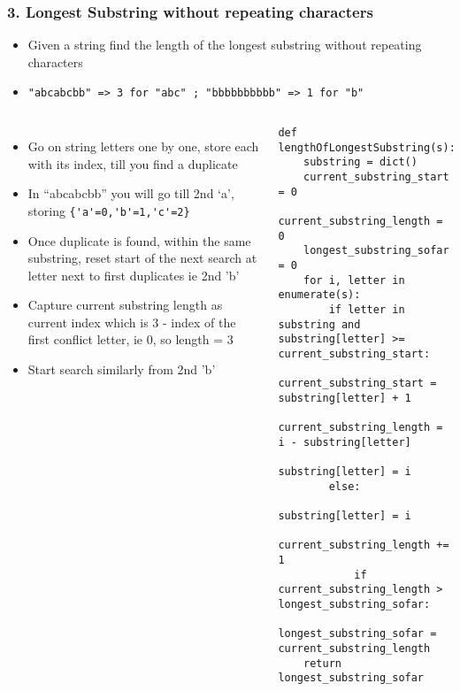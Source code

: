 \begin{frame}[fragile]\frametitle{3. Longest Substring without repeating characters}


	\begin{itemize}
	\item Given a string find the length of the longest substring without repeating characters
	\item \lstinline|"abcabcbb" => 3 for "abc" ; "bbbbbbbbbb" => 1 for "b"|
	\end{itemize}
	
	\begin{columns}[T]
	\begin{itemize}
	\item Go on string letters one by one, store each with its index, till you find a duplicate 
	\item In ``abcabcbb'' you will go till 2nd `a', storing \lstinline|{'a'=0,'b'=1,'c'=2}| 
	\item Once duplicate is found, within the same substring, reset start of the next search at letter next to first duplicates ie 2nd 'b'
	\item Capture current substring length as current index which is 3 - index of the first conflict letter, ie 0, so length = 3
	\item Start search similarly from 2nd 'b'
	\end{itemize}
		\begin{lstlisting}[basicstyle=\scriptsize]
def lengthOfLongestSubstring(s):
    substring = dict()
    current_substring_start = 0
    current_substring_length = 0
    longest_substring_sofar = 0
    for i, letter in enumerate(s):
        if letter in substring and substring[letter] >= current_substring_start:
            current_substring_start = substring[letter] + 1
            current_substring_length = i - substring[letter]
            substring[letter] = i
        else:
            substring[letter] = i
            current_substring_length += 1
            if current_substring_length > longest_substring_sofar:
                longest_substring_sofar = current_substring_length
    return longest_substring_sofar
				\end{lstlisting}		
	\end{columns}
	
\end{frame}


